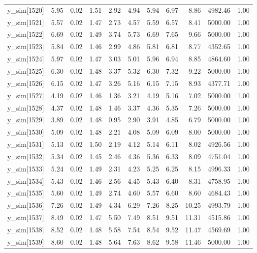 \begin{table}[ht]
\begin{tabular}{rrrrrrrrrrr}
  y\_sim[1520] & 5.95 & 0.02 & 1.51 & 2.92 & 4.94 & 5.94 & 6.97 & 8.86 & 4982.46 & 1.00 \\ 
  y\_sim[1521] & 5.57 & 0.02 & 1.47 & 2.73 & 4.57 & 5.59 & 6.57 & 8.41 & 5000.00 & 1.00 \\ 
  y\_sim[1522] & 6.69 & 0.02 & 1.49 & 3.74 & 5.73 & 6.69 & 7.65 & 9.66 & 5000.00 & 1.00 \\ 
  y\_sim[1523] & 5.84 & 0.02 & 1.46 & 2.99 & 4.86 & 5.81 & 6.81 & 8.77 & 4352.65 & 1.00 \\ 
  y\_sim[1524] & 5.97 & 0.02 & 1.47 & 3.03 & 5.01 & 5.96 & 6.94 & 8.85 & 4864.60 & 1.00 \\ 
  y\_sim[1525] & 6.30 & 0.02 & 1.48 & 3.37 & 5.32 & 6.30 & 7.32 & 9.22 & 5000.00 & 1.00 \\ 
  y\_sim[1526] & 6.15 & 0.02 & 1.47 & 3.26 & 5.16 & 6.15 & 7.15 & 8.93 & 4377.71 & 1.00 \\ 
  y\_sim[1527] & 4.19 & 0.02 & 1.46 & 1.36 & 3.21 & 4.19 & 5.16 & 7.02 & 5000.00 & 1.00 \\ 
  y\_sim[1528] & 4.37 & 0.02 & 1.48 & 1.46 & 3.37 & 4.36 & 5.35 & 7.26 & 5000.00 & 1.00 \\ 
  y\_sim[1529] & 3.89 & 0.02 & 1.48 & 0.95 & 2.90 & 3.91 & 4.85 & 6.79 & 5000.00 & 1.00 \\ 
  y\_sim[1530] & 5.09 & 0.02 & 1.48 & 2.21 & 4.08 & 5.09 & 6.09 & 8.00 & 5000.00 & 1.00 \\ 
  y\_sim[1531] & 5.13 & 0.02 & 1.50 & 2.19 & 4.12 & 5.14 & 6.11 & 8.02 & 4926.56 & 1.00 \\ 
  y\_sim[1532] & 5.34 & 0.02 & 1.45 & 2.46 & 4.36 & 5.36 & 6.33 & 8.09 & 4751.04 & 1.00 \\ 
  y\_sim[1533] & 5.24 & 0.02 & 1.49 & 2.31 & 4.23 & 5.25 & 6.25 & 8.15 & 4996.33 & 1.00 \\ 
  y\_sim[1534] & 5.43 & 0.02 & 1.46 & 2.56 & 4.45 & 5.43 & 6.40 & 8.31 & 4758.95 & 1.00 \\ 
  y\_sim[1535] & 5.60 & 0.02 & 1.49 & 2.74 & 4.60 & 5.57 & 6.60 & 8.60 & 4684.43 & 1.00 \\ 
  y\_sim[1536] & 7.26 & 0.02 & 1.49 & 4.34 & 6.29 & 7.26 & 8.25 & 10.25 & 4993.79 & 1.00 \\ 
  y\_sim[1537] & 8.49 & 0.02 & 1.47 & 5.50 & 7.49 & 8.51 & 9.51 & 11.31 & 4515.86 & 1.00 \\ 
  y\_sim[1538] & 8.52 & 0.02 & 1.48 & 5.58 & 7.54 & 8.54 & 9.52 & 11.47 & 4569.69 & 1.00 \\ 
  y\_sim[1539] & 8.60 & 0.02 & 1.48 & 5.64 & 7.63 & 8.62 & 9.58 & 11.46 & 5000.00 & 1.00 \\ 

\end{tabular}
\end{table}
